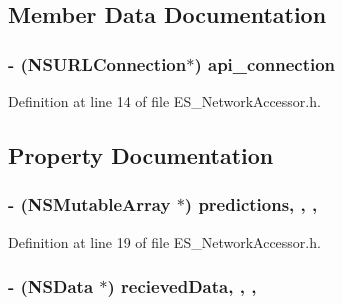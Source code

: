 \subsection{Member Data Documentation}
\hypertarget{interface_e_s___network_accessor_a5ac880142f4a694b58b7a083815919e8}{
\subsubsection[{api\+\_\+connection}]{\setlength{\rightskip}{0pt plus 5cm}-\/ (N\+S\+U\+R\+L\+Connection$\ast$) api\+\_\+connection\hspace{0.3cm}{\ttfamily [protected]}}}\label{interface_e_s___network_accessor_a5ac880142f4a694b58b7a083815919e8}


Definition at line 14 of file E\+S\+\_\+\+Network\+Accessor.\+h.



\subsection{Property Documentation}
\hypertarget{interface_e_s___network_accessor_aebf4979976f8811eea946a010244f878}{
\subsubsection[{predictions}]{\setlength{\rightskip}{0pt plus 5cm}-\/ (N\+S\+Mutable\+Array $\ast$) predictions\hspace{0.3cm}{\ttfamily [read]}, {\ttfamily [write]}, {\ttfamily [nonatomic]}, {\ttfamily [strong]}}}\label{interface_e_s___network_accessor_aebf4979976f8811eea946a010244f878}


Definition at line 19 of file E\+S\+\_\+\+Network\+Accessor.\+h.

\hypertarget{interface_e_s___network_accessor_ae29e3067b43b47f9af10286651ee3e51}{
\subsubsection[{recieved\+Data}]{\setlength{\rightskip}{0pt plus 5cm}-\/ (N\+S\+Data $\ast$) recieved\+Data\hspace{0.3cm}{\ttfamily [read]}, {\ttfamily [write]}, {\ttfamily [nonatomic]}, {\ttfamily [strong]}}}\label{interface_e_s___network_accessor_ae29e3067b43b47f9af10286651ee3e51}


